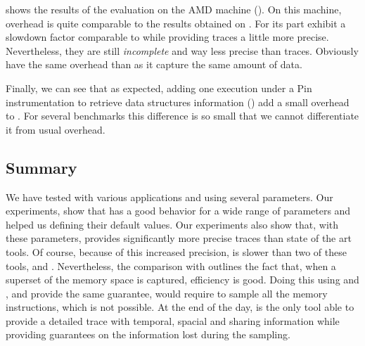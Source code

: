  shows the results of the evaluation on the AMD machine
(\Stremi). On this machine, \Moca overhead is quite comparable to the results
obtained on \Edel.
For its part \MemProf exhibit a slowdown factor comparable to \Mitos while
providing traces a little more precise. Nevertheless, they are still \emph{incomplete} and
way less precise than \Moca traces. Obviously \MemProfTun have the same
overhead than \MemProf as it capture the same amount of data.

Finally, we can see that as expected, adding one execution under a Pin
instrumentation to retrieve data structures information (\MocaPin) add a small overhead
to \Moca. For several benchmarks this difference is so small that we cannot
differentiate it from \Moca usual overhead.

\subsection{Summary}
\label{sec:expe-cncl}

We have tested \Moca with various applications and using several parameters.
Our experiments, show that \Moca has a good behavior for a wide range of
parameters and helped us defining their default values. Our experiments also
show that, with these parameters, \Moca provides significantly more precise traces
than state of the art tools.
Of course, because of this increased precision, \Moca is slower than two of these tools,
\MemProf and \Mitos.
Nevertheless, the comparison with \TABARNAC outlines the fact that, when a superset of the memory
space is captured, \Moca efficiency is good.
Doing this using \MemProf and \Mitos, and provide the same guarantee, would require to sample all the memory instructions, which is not possible.
At the end of the day, \Moca is the only tool able to provide a
detailed trace with temporal, spacial and sharing information while providing
guarantees on the information lost during the sampling.
